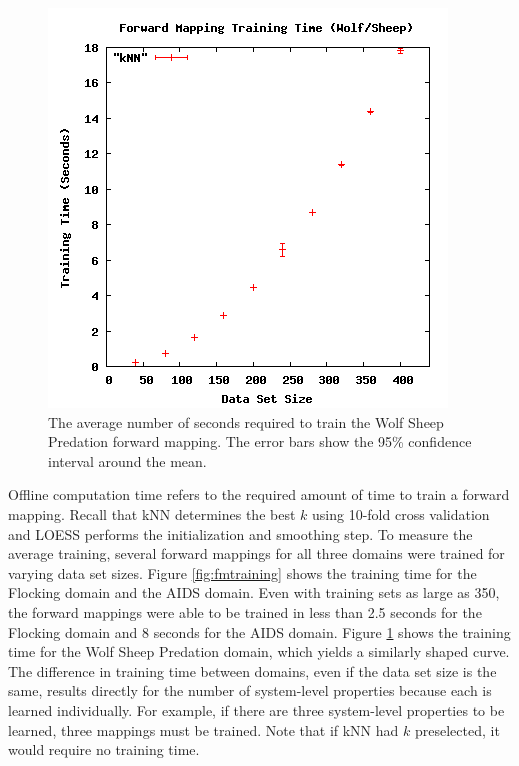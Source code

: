 \begin{figure}[ht]
\centering
\includegraphics[scale=.5]{images/results_wolfsheep/fm-training.png}
\caption{The average number of seconds required to train the Wolf Sheep Predation forward mapping.
The error bars show the 95\% confidence interval around the mean.}
\label{fig:wolfsheepfmtraining}
\end{figure}

Offline computation time refers to the required amount of time to train a forward mapping.
Recall that kNN determines the best $k$ using 10-fold cross validation and LOESS performs the initialization and smoothing step.
To measure the average training, several forward mappings for all three domains were trained for varying data set sizes.
Figure \ref{fig:fmtraining} shows the training time for the Flocking domain and the AIDS domain.
Even with training sets as large as 350, the forward mappings were able to be trained in less than 2.5 seconds for the Flocking domain and 8 seconds for the AIDS domain.
Figure \ref{fig:wolfsheepfmtraining} shows the training time for the Wolf Sheep Predation domain, which yields a similarly shaped curve.
The difference in training time between domains, even if the data set size is the same, results directly for the number of system-level properties because each is learned individually.
For example, if there are three system-level properties to be learned, three mappings must be trained.
Note that if kNN had $k$ preselected, it would require no training time.



